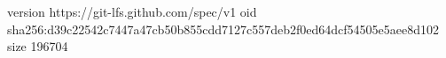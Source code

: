 version https://git-lfs.github.com/spec/v1
oid sha256:d39c22542c7447a47cb50b855cdd7127c557deb2f0ed64dcf54505e5aee8d102
size 196704
